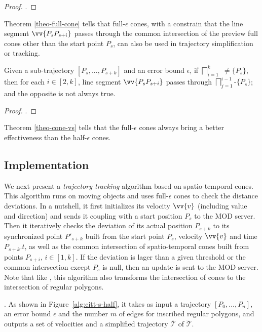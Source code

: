 \begin{proof}
	\todo.
\end{proof}

Theorem \ref{theo-full-cone} tells that full-$\epsilon$ cones, with a constrain that the line segment $\vv{P_sP_{s+i}}$ passes through the common intersection of the preview full cones other than the start point $P_s$, can also be used in trajectory simplification or tracking. 

\begin{theorem}
	\label{theo-cone-vs}
	Given a sub-trajectory $[P_s,...,P_{s+k}]$ and an error bound $\epsilon$, if $\bigsqcap_{i=1}^{k}$ $\ne \{P_s\}$, then for each $i \in [2, k]$, line segment $\vv{P_sP_{s+i}}$ passes through $\bigsqcap_{j=1}^{i-1}$-$\{P_s\}$; and the opposite is not always true.
\end{theorem}

\begin{proof}
	\todo.
\end{proof}

Theorem \ref{theo-cone-vs} tells that the full-$\epsilon$ cones always bring a better effectiveness than the half-$\epsilon$ cones.

\subsection{Implementation}

We next present a {\em trajectory tracking} algorithm based on spatio-temporal cones. This algorithm runs on moving objects and uses full-$\epsilon$ cones to check the distance deviations. In a nutshell, it first initializes its velocity $\vv{v}$ (including value and direction) and sends it coupling with a start position $P_s$ to the MOD server. Then it iteratively checks the deviation of its actual position $P_{s+k}$ to its synchronized point $P'_{s+k}$ built from the start point $P_s$, velocity $\vv{v}$ and time $P_{s+k}.t$, as well as the common intersection of spatio-temporal cones built from points $P_{s+i}$, $i \in [1, k]$. If the deviation is lager than a given threshold or the common intersection except $P_s$ is null, then an update is sent to the MOD server. Note that like \cised, this algorithm also transforms the intersection of cones to the intersection of regular polygons.


.
As shown in Figure~\ref{alg:citt-s-half}, it takes as input a trajectory ${[P_0, \ldots, P_n]}$, an error bound $\epsilon$ and the number $m$ of edges for inscribed regular polygons, and outputs a set of velocities and a simplified  trajectory $\overline{\mathcal{T}}$ of $\dddot{\mathcal{T}}$.

